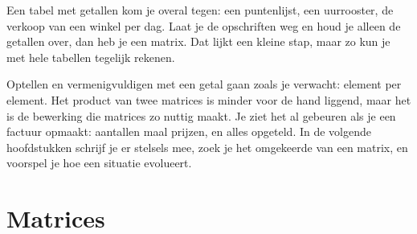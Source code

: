 %



Een tabel met getallen kom je overal tegen: een puntenlijst, een uurrooster, de verkoop van een winkel per dag. Laat je de opschriften weg en houd je alleen de getallen over, dan heb je een matrix. Dat lijkt een kleine stap, maar zo kun je met hele tabellen tegelijk rekenen.

Optellen en vermenigvuldigen met een getal gaan zoals je verwacht: element per element. Het product van twee matrices is minder voor de hand liggend, maar het is de bewerking die matrices zo nuttig maakt. Je ziet het al gebeuren als je een factuur opmaakt: aantallen maal prijzen, en alles opgeteld. In de volgende hoofdstukken schrijf je er stelsels mee, zoek je het omgekeerde van een matrix, en voorspel je hoe een situatie evolueert.

\begin{oefeningen}[Start]

\end{oefeningen}


\section{Matrices}

